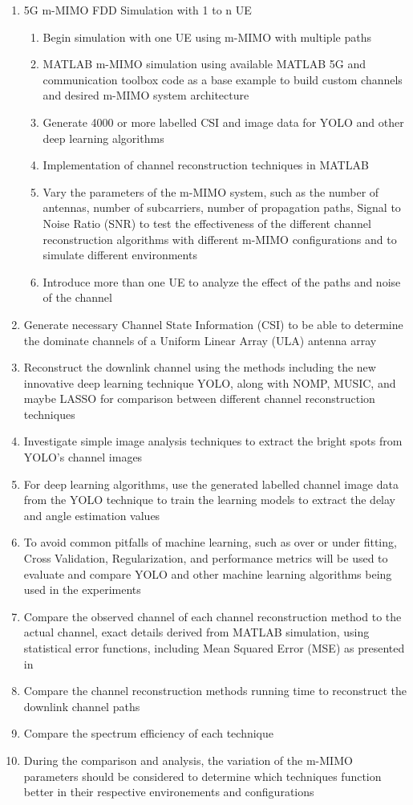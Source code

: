 \iffalse
\begin{enumerate}
    \item 5G m-MIMO FDD Simulation with 1 to n UE
    \begin{enumerate}
        \item Begin simulation with one UE using m-MIMO with multiple paths
        \item MATLAB m-MIMO simulation using available MATLAB 5G and communication toolbox code as a base example to build custom channels and desired m-MIMO system architecture
        \item Generate 4000 or more labelled CSI and image data for YOLO and other deep learning algorithms
        \item Implementation of channel reconstruction techniques in MATLAB
        \item Vary the parameters of the m-MIMO system, such as the number of antennas, number of subcarriers, number of propagation paths, Signal to Noise Ratio (SNR) to test the effectiveness of the different channel reconstruction algorithms with different m-MIMO configurations and to simulate different environments
        \item Introduce more than one UE to analyze the effect of the paths and noise of the channel
    \end{enumerate}
    \item Generate necessary Channel State Information (CSI) to be able to determine the dominate channels of a Uniform Linear Array (ULA) antenna array
    \item Reconstruct the downlink channel using the methods including the new innovative deep learning technique YOLO, along with NOMP, MUSIC, and maybe LASSO for comparison between different channel reconstruction techniques
    \item Investigate simple image analysis techniques to extract the bright spots from YOLO's channel images
    \item For deep learning algorithms, use the generated labelled channel image data from the YOLO technique to train the learning models to extract the delay and angle estimation values
    \item To avoid common pitfalls of machine learning, such as over or under fitting, Cross Validation, Regularization, and performance metrics will be used to evaluate and compare YOLO and other machine learning algorithms being used in the experiments
    \item Compare the observed channel of each channel reconstruction method to the actual channel, exact details derived from MATLAB simulation, using statistical error functions, including Mean Squared Error (MSE) as presented in \cite{Li2020}
    \item Compare the channel reconstruction methods running time to reconstruct the downlink channel paths
    \item Compare the spectrum efficiency of each technique
    \item During the comparison and analysis, the variation of the m-MIMO parameters should be considered to determine which techniques function better in their respective environements and configurations
\end{enumerate}
